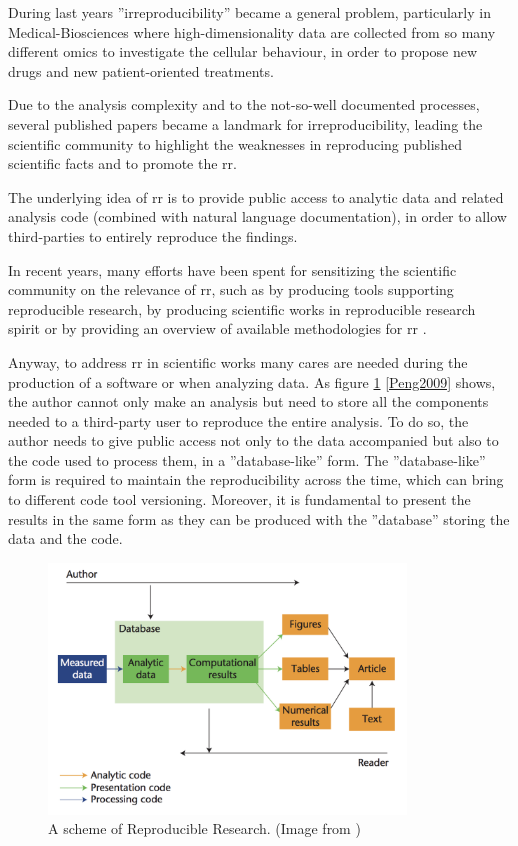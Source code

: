 During last years ''irreproducibility'' became a general problem, particularly in Medical-Biosciences where high-dimensionality data are collected from so many different omics to investigate the cellular behaviour, in order to propose new drugs and new patient-oriented treatments.

Due to the analysis complexity and to the not-so-well documented processes, several published papers \cite{Baggerly2009, Potti2011} became a landmark for irreproducibility, leading the scientific community to highlight the weaknesses in reproducing published scientific facts and to promote the \gls{rr}.

The underlying idea of \gls{rr} \cite{Fomel2009b} is to provide public access to analytic data and related analysis code (combined with natural language documentation), in order to allow third-parties to entirely reproduce the findings.

In recent years, many efforts have been spent for sensitizing the scientific community on the relevance of \gls{rr}, such as by producing tools \cite{RussoRighelli2016} supporting reproducible research, by producing scientific works in reproducible research spirit \cite{CostaRighelli2017} or by providing an overview of available methodologies for \gls{rr} \cite{russo2015advantages}.

Anyway, to address \gls{rr} in scientific works many cares are needed during the production of a software or when analyzing data.
As figure \ref{fig:introrr} \ref{Peng2009} shows, the author cannot only make an analysis but need to store all the components needed to a third-party user to reproduce the entire analysis.
To do so, the author needs to give public access not only to the data accompanied but also to the code used to process them, in a ''database-like'' form. 
The ''database-like'' form is required to maintain the reproducibility across the time, which can bring to different code tool versioning.
Moreover, it is fundamental to present the results in the same form as they can be produced with the ''database'' storing the data and the code.

\begin{figure}[H]
\centering
\includegraphics[width=9.5cm, keepaspectratio]{img/intro/rr_scheme.png}
\caption[RR generic scheme]{A scheme of Reproducible Research. (Image from \cite{Peng2009})}
\label{fig:introrr}
\end{figure}

